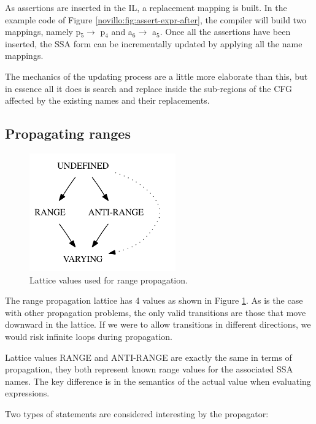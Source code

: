 As assertions are inserted in the IL, a replacement mapping is
built.  In the example code of Figure
\ref{novillo:fig:assert-expr-after}, the compiler will build two
mappings, namely p$_5 \rightarrow$ p$_4$ and a$_6 \rightarrow$
a$_5$.  Once all the assertions have been inserted, the SSA form 
can be incrementally updated by applying all the name mappings.

The mechanics of the updating process are a little more
elaborate than this, but in essence all it does is search and
replace inside the sub-regions of the CFG affected by the
existing names and their replacements.

\subsection{Propagating ranges}

\begin{figure}
    \centering
    \parbox{2in}{\includegraphics[height=2in]{vrp-4}}
    \caption{Lattice values used for range propagation.}
    \label{novillo:fig:vrp-lattice}
\end{figure}

The range propagation lattice has 4 values as shown in Figure
\ref{novillo:fig:vrp-lattice}.  As is the case with other
propagation problems, the only valid transitions are those that
move downward in the lattice.  If we were to allow transitions in
different directions, we would risk infinite loops during
propagation.

Lattice values \textsc{RANGE} and \textsc{ANTI-RANGE} are exactly
the same in terms of propagation, they both represent known
range values for the associated SSA names.  The key difference is
in the semantics of the actual value when evaluating expressions.

Two types of statements are considered interesting by the
propagator:

